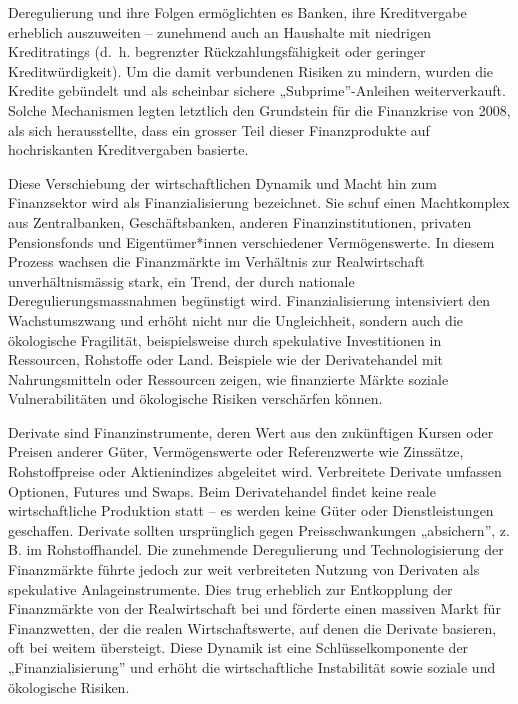 \documentclass[
  nswissgerman,
  a4paper,
  openany]{book}
\begin{document}
Deregulierung und ihre Folgen ermöglichten es Banken, ihre Kreditvergabe
erheblich auszuweiten -- zunehmend auch an Haushalte mit niedrigen
Kreditratings (d.~h. begrenzter Rückzahlungsfähigkeit oder geringer
Kreditwürdigkeit). Um die damit verbundenen Risiken zu mindern, wurden
die Kredite gebündelt und als scheinbar sichere „Subprime''-Anleihen
weiterverkauft. Solche Mechanismen legten letztlich den Grundstein für
die Finanzkrise von 2008, als sich herausstellte, dass ein grosser Teil
dieser Finanzprodukte auf hochriskanten Kreditvergaben basierte.

Diese Verschiebung der wirtschaftlichen Dynamik und Macht hin zum
Finanzsektor wird als Finanzialisierung bezeichnet. Sie schuf einen
Machtkomplex aus Zentralbanken, Geschäftsbanken, anderen
Finanzinstitutionen, privaten Pensionsfonds und Eigentümer*innen
verschiedener Vermögenswerte. In diesem Prozess wachsen die Finanzmärkte
im Verhältnis zur Realwirtschaft unverhältnismässig stark, ein Trend,
der durch nationale Deregulierungsmassnahmen begünstigt wird.
Finanzialisierung intensiviert den Wachstumszwang und erhöht nicht nur
die Ungleichheit, sondern auch die ökologische Fragilität,
beispielsweise durch spekulative Investitionen in Ressourcen, Rohstoffe
oder Land. Beispiele wie der Derivatehandel mit Nahrungsmitteln oder
Ressourcen zeigen, wie finanzierte Märkte soziale Vulnerabilitäten und
ökologische Risiken verschärfen können.

\begin{tcolorbox}[enhanced jigsaw, arc=.35mm, bottomrule=.15mm, bottomtitle=1mm, breakable, colback=white, colbacktitle=quarto-callout-note-color!10!white, colframe=quarto-callout-note-color-frame, coltitle=black, left=2mm, leftrule=.75mm, opacityback=0, opacitybacktitle=0.6, rightrule=.15mm, title={Was sind Derivate und wie tragen sie zur Finanzialisierung bei?}, titlerule=0mm, toprule=.15mm, toptitle=1mm]

Derivate sind Finanzinstrumente, deren Wert aus den zukünftigen Kursen
oder Preisen anderer Güter, Vermögenswerte oder Referenzwerte wie
Zinssätze, Rohstoffpreise oder Aktienindizes abgeleitet wird.
Verbreitete Derivate umfassen Optionen, Futures und Swaps. Beim
Derivatehandel findet keine reale wirtschaftliche Produktion statt -- es
werden keine Güter oder Dienstleistungen geschaffen. Derivate sollten
ursprünglich gegen Preisschwankungen „absichern'', z. B. im
Rohstoffhandel. Die zunehmende Deregulierung und Technologisierung der
Finanzmärkte führte jedoch zur weit verbreiteten Nutzung von Derivaten
als spekulative Anlageinstrumente. Dies trug erheblich zur Entkopplung
der Finanzmärkte von der Realwirtschaft bei und förderte einen massiven
Markt für Finanzwetten, der die realen Wirtschaftswerte, auf denen die
Derivate basieren, oft bei weitem übersteigt. Diese Dynamik ist eine
Schlüsselkomponente der „Finanzialisierung'' und erhöht die
wirtschaftliche Instabilität sowie soziale und ökologische Risiken.

\end{tcolorbox}
\end{document}
